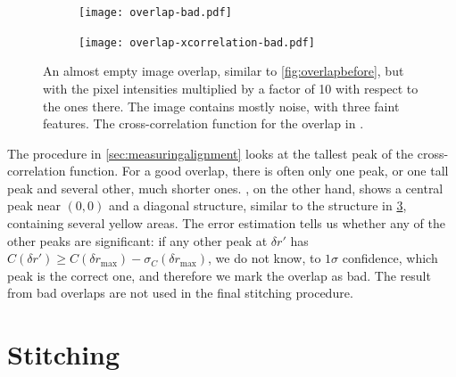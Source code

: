 \documentclass{article}
\begin{document}
\begin{figure}[ht]
	\centering
	\begin{subfigure}{0.45\linewidth}
		\texttt{[image: overlap-bad.pdf]}
		\caption{}
		\label{fig:badimage}
	\end{subfigure}
	\begin{subfigure}{0.45\linewidth}
		\texttt{[image: overlap-xcorrelation-bad.pdf]}
		\caption{}
		\label{fig:badxcorrelation}
	\end{subfigure}
	\caption{ An almost empty image overlap, similar to \cref{fig:overlapbefore}, but with the pixel intensities multiplied by a factor of 10 with respect to the ones there.  The image contains mostly noise, with three faint features.   The cross-correlation function for the overlap in .}
	\label{fig:badoverlap}
\end{figure}

The procedure in \cref{sec:measuringalignment} looks at the tallest peak of the cross-correlation function.  For a good overlap, there is often only one peak, or one tall peak and several other, much shorter ones.  , on the other hand, shows a central peak near $(0, 0)$ and a diagonal structure, similar to the structure in \cref{fig:badoverlap}, containing several yellow areas.  The error estimation tells us whether any of the other peaks are significant: if any other peak at $\delta r'$ has $C(\delta r')\ge C(\delta r_\text{max})-\sigma_C(\delta r_\text{max})$, we do not know, to $1\sigma$ confidence, which peak is the correct one, and therefore we mark the overlap as bad.  The result from bad overlaps are not used in the final stitching procedure.

\section{Stitching}
\label{sec:stitching}
\end{document}
